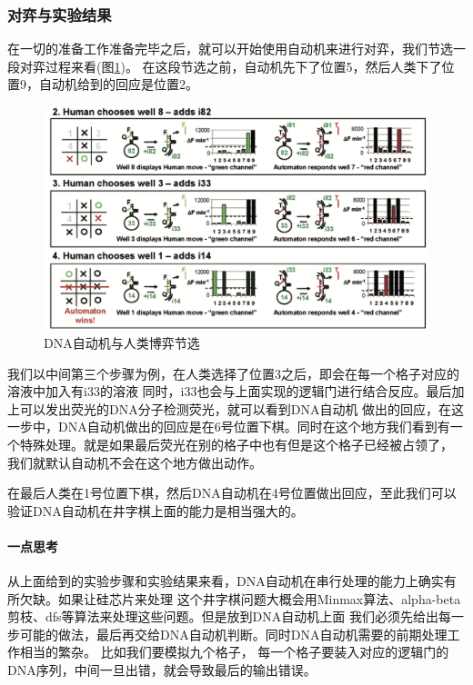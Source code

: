 \documentclass[a4paper,twoside]{article}
\begin{document}
\subsubsection{对弈与实验结果}
在一切的准备工作准备完毕之后，就可以开始使用自动机来进行对弈，我们节选一段对弈过程来看(图\ref{automaton-battle})。
在这段节选之前，自动机先下了位置5，然后人类下了位置9，自动机给到的回应是位置2。
\begin{figure}[htbp]
	\centering
	\includegraphics[width=0.95\linewidth]{images/automaton-battle.png}
	\caption{DNA自动机与人类博弈节选\protect\footnotemark[1]}
	\label{automaton-battle}
\end{figure}

我们以中间第三个步骤为例，在人类选择了位置3之后，即会在每一个格子对应的溶液中加入有i33的溶液
同时，i33也会与上面实现的逻辑门进行结合反应。最后加上可以发出荧光的DNA分子检测荧光，就可以看到DNA自动机
做出的回应，在这一步中，DNA自动机做出的回应是在6号位置下棋。同时在这个地方我们看到有一个特殊处理。就是如果最后荧光在别的格子中也有但是这个格子已经被占领了，
我们就默认自动机不会在这个地方做出动作。

在最后人类在1号位置下棋，然后DNA自动机在4号位置做出回应，至此我们可以验证DNA自动机在井字棋上面的能力是相当强大的。

\paragraph{一点思考}
从上面给到的实验步骤和实验结果来看，DNA自动机在串行处理的能力上确实有所欠缺。如果让硅芯片来处理
这个井字棋问题大概会用Minmax算法、alpha-beta剪枝、dfs等算法来处理这些问题。但是放到DNA自动机上面
我们必须先给出每一步可能的做法，最后再交给DNA自动机判断。同时DNA自动机需要的前期处理工作相当的繁杂。
比如我们要模拟九个格子， 每一个格子要装入对应的逻辑门的DNA序列，中间一旦出错，就会导致最后的输出错误。
\end{document}
